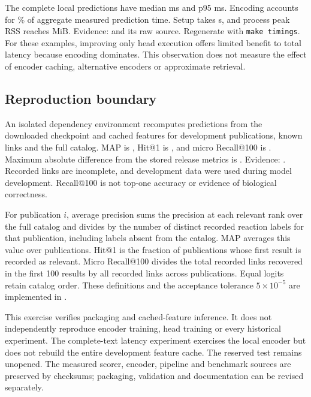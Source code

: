 \documentclass[11pt,a4paper]{article}
\begin{document}
The \EndRequests{} complete local predictions have median \EndMedian{} ms and p95
\EndPninetyfive{} ms. Encoding accounts for \EncodingShare\% of aggregate measured
prediction time. Setup takes \SetupSeconds{} s, and process peak RSS reaches
\EndMemory{} MiB. Evidence:  and its raw
source. Regenerate with \texttt{make timings}. For these examples, improving only head execution offers limited benefit
to total latency because encoding dominates. This observation does not measure
the effect of encoder caching, alternative encoders or approximate retrieval.

\subsection{Reproduction boundary}
An isolated dependency environment recomputes predictions from the downloaded
checkpoint and cached features for \PublicationCount{} development publications,
\KnownLinks{} known links and the full catalog. MAP is \MeasuredMAP{}, Hit@1 is
\MeasuredHit{}, and micro Recall@100 is \MeasuredRecall{}. Maximum absolute
difference from the stored release metrics is \MetricError{}.
Evidence: . Recorded links are incomplete,
and development data were used during model development. Recall@100 is not
top-one accuracy or evidence of biological correctness.

For publication $i$, average precision sums the precision at each relevant
rank over the full catalog and divides by the number of distinct recorded
reaction labels for that publication, including labels absent from the catalog.
MAP averages this value over publications. Hit@1 is the fraction of publications
whose first result is recorded as relevant. Micro Recall@100 divides the total
recorded links recovered in the first 100 results by all recorded links across
publications. Equal logits retain catalog order. These definitions and the
acceptance tolerance $5\times10^{-5}$ are implemented in
.

This exercise verifies packaging and cached-feature inference. It does not
independently reproduce encoder training, head training or every historical
experiment. The complete-text latency experiment exercises the local encoder but
does not rebuild the entire development feature cache. The reserved test remains
unopened. The measured scorer, encoder, pipeline and benchmark sources are preserved by
checksums; packaging, validation and documentation can be revised separately.
\end{document}
